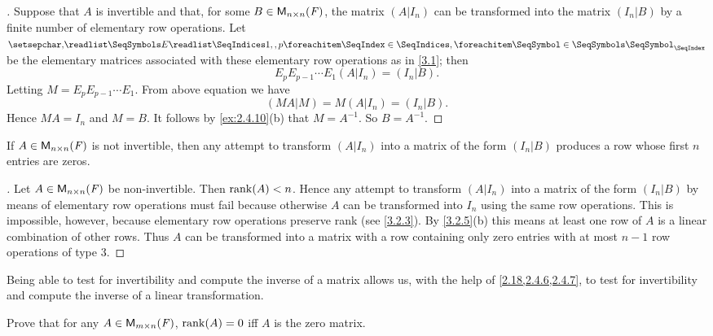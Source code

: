 \begin{proof}[]
	Suppose that \(A\) is invertible and that, for some \(B \in \ms[n][n][\F]\), the matrix \((A | I_n)\) can be transformed into the matrix \((I_n | B)\) by a finite number of elementary row operations.
	Let \(\seq{E}{1,,p}\) be the elementary matrices associated with these elementary row operations as in \cref{3.1};
	then
	\[
		E_p E_{p - 1} \cdots E_1 (A | I_n) = (I_n | B).
	\]
	Letting \(M = E_p E_{p - 1} \cdots E_1\).
	From above equation we have
	\[
		(MA | M) = M (A | I_n) = (I_n | B).
	\]
	Hence \(MA = I_n\) and \(M = B\).
	It follows by \cref{ex:2.4.10}(b) that \(M = A^{-1}\).
	So \(B = A^{-1}\).
\end{proof}

\begin{cor}\label{3.2.10}
	If \(A \in \ms[n][n][\F]\) is not invertible, then any attempt to transform \((A | I_n)\) into a matrix of the form \((I_n | B)\) produces a row whose first \(n\) entries are zeros.
\end{cor}

\begin{proof}[]
	Let \(A \in \ms[n][n][\F]\) be non-invertible.
	Then \(\rk{A} < n\).
	Hence any attempt to transform \((A | I_n)\) into a matrix of the form \((I_n | B)\) by means of elementary row operations must fail because otherwise \(A\) can be transformed into \(I_n\) using the same row operations.
	This is impossible, however, because elementary row operations preserve rank
	(see \cref{3.2.3}).
	By \cref{3.2.5}(b) this means at least one row of \(A\) is a linear combination of other rows.
	Thus \(A\) can be transformed into a matrix with a row containing only zero entries with at most \(n - 1\) row operations of type 3.
\end{proof}

\begin{note}
	Being able to test for invertibility and compute the inverse of a matrix allows us, with the help of \cref{2.18,2.4.6,2.4.7}, to test for invertibility and compute the inverse of a linear transformation.
\end{note}

\exercisesection

\setcounter{ex}{2}
\begin{ex}\label{ex:3.2.3}
	Prove that for any \(A \in \ms\), \(\rk{A} = 0\) iff \(A\) is the zero matrix.
\end{ex}

